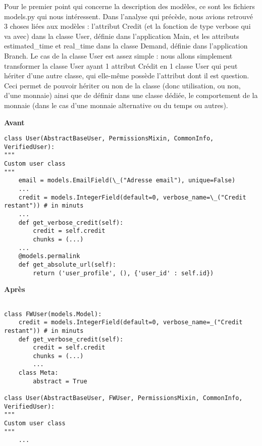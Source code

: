 Pour le premier point qui concerne la description des modèles,  ce sont les fichiers models.py qui nous intéressent.  Dans l'analyse qui précède,  nous avions retrouvé 3 choses liées aux modèles : l'attribut Credit (et la fonction de type verbose qui va avec) dans la classe User,  définie dans l'application Main,  et les attributs estimated\_time et real\_time dans la classe Demand,  définie dans l'application Branch.  Le cas de la classe User est assez simple : nous allons simplement transformer la classe User ayant 1 attribut Crédit en 1 classe User qui peut hériter d'une autre classe,  qui elle-même possède l'attribut dont il est question.  Ceci permet de pouvoir hériter ou non de la classe (donc utilisation,  ou non,  d'une monnaie) ainsi que de définir dans une classe dédiée,  le comportement de la monnaie (dans le cas d'une monnaie alternative ou du temps ou autres).  

\begin{minipage}{.5\textwidth}
\begin{center} \textbf{Avant}\end{center}
\begin{lstlisting}
class User(AbstractBaseUser, PermissionsMixin, CommonInfo, VerifiedUser):
"""
Custom user class
"""
	email = models.EmailField(\_("Adresse email"), unique=False)
	...
	credit = models.IntegerField(default=0, verbose_name=\_("Credit restant")) # in minuts
	...
	def get_verbose_credit(self):
		credit = self.credit
		chunks = (...)
	...
	@models.permalink
	def get_absolute_url(self):
		return ('user_profile', (), {'user_id' : self.id})
\end{lstlisting} 
\end{minipage}
\hspace{0.3cm}
\begin{minipage}{.5\textwidth}
\begin{center} \textbf{Après}\end{center}
\begin{lstlisting}

class FWUser(models.Model):
    credit = models.IntegerField(default=0, verbose_name=_("Credit restant")) # in minuts   
    def get_verbose_credit(self):
        credit = self.credit
        chunks = (...)
        ...
    class Meta:
        abstract = True

class User(AbstractBaseUser, FWUser, PermissionsMixin, CommonInfo, VerifiedUser):
"""
Custom user class
"""
	...
\end{lstlisting} 
\end{minipage}

